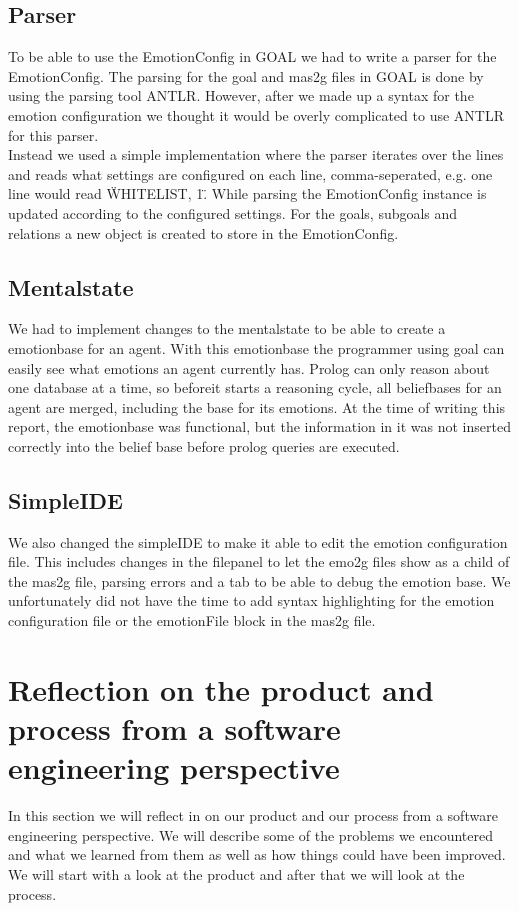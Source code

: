 \documentclass[11pt]{article}
\begin{document}
\subsection{Parser}
To be able to use the EmotionConfig in GOAL we had to write a parser for the EmotionConfig. The parsing for the goal and mas2g files in GOAL is done by using the parsing tool ANTLR. However, after we made up a syntax for the emotion configuration we thought it would be overly complicated to use ANTLR for this parser.\\
Instead we used a simple implementation where the parser iterates over the lines and reads what settings are configured on each line, comma-seperated, e.g. one line would read \"WHITELIST, 1\". While parsing the EmotionConfig instance is updated according to the configured settings. For the goals, subgoals and relations a new object is created to store in the EmotionConfig. 

\subsection{Mentalstate}
We had to implement changes to the mentalstate to be able to create a emotionbase for an agent. With this emotionbase the programmer using goal can easily see what emotions an agent currently has. Prolog can only reason about one database at a time, so beforeit starts a reasoning cycle, all beliefbases for an agent are merged, including the base for its emotions. At the time of writing this report, the emotionbase was functional, but the information in it was not inserted correctly into the belief base before prolog queries are executed. 

\subsection{SimpleIDE}
We also changed the simpleIDE to make it able to edit the emotion configuration file. This includes changes in the filepanel to let the emo2g files show as a child of the mas2g file, parsing errors and a tab to be able to debug the emotion base. We unfortunately did not have the time to add syntax highlighting for the emotion configuration file or the emotionFile block in the mas2g file. 

\clearpage

\section{Reflection on the product and process from a software engineering perspective}
In this section we will reflect in on our product and our process from a software engineering perspective. We will describe some of the problems we encountered and what we learned from them as well as how things could have been improved. We will start with a look at the product and after that we will look at the process.
\end{document}

